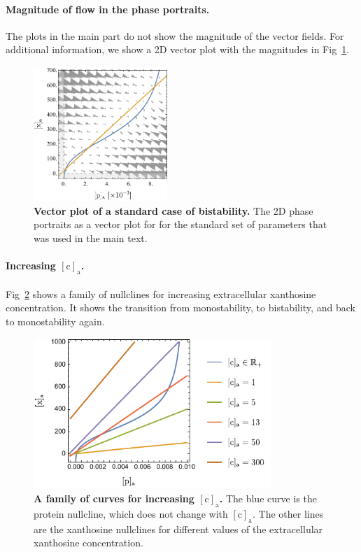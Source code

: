 \documentclass[10pt,letterpaper]{article}
\newcommand{\n}[1]{\mathrm{#1}}
\begin{document}
\paragraph*{Magnitude of flow in the phase portraits.} The plots in the main part do not show the magnitude of the vector fields. For additional information, we show a 2D vector plot with the magnitudes in Fig~\ref{figS4:vector}.

\begin{figure}
	\centering
	\includegraphics[width=0.45\textwidth]{FigSI4.pdf}
	\caption{{\bf Vector plot of a standard case of bistability.}
		The 2D phase portraits as a vector plot for for the standard set of parameters that was used in the main text.}
	\label{figS4:vector} 
\end{figure}

\paragraph*{Increasing $\n{[c]_a}$.}
Fig~\ref{figS5:incC} shows a family of nullclines for increasing extracellular xanthosine concentration. It shows the transition from monostability, to bistability, and back to monostability again.

\begin{figure}
	\centering
	\includegraphics[width=0.8\textwidth]{FigSI5.pdf}
	\caption{{\bf A family of curves for increasing $\n{[c]_a}$.}
		The blue curve is the protein nullcline, which does not change with $\n{[c]_a}$. The other lines are the xanthosine nullclines for different values of the extracellular xanthosine concentration.}
	\label{figS5:incC}
\end{figure}
\end{document}
